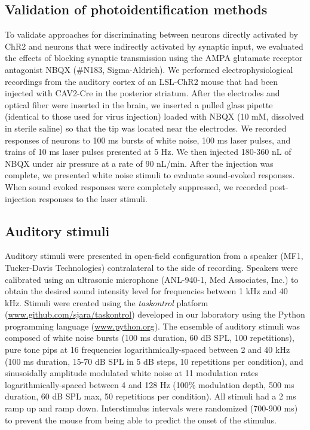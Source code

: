 \subsection{Validation of photoidentification methods}
To validate approaches for discriminating between neurons directly activated by ChR2 and neurons that were indirectly activated by synaptic input, we evaluated the effects of blocking synaptic transmission using the AMPA glutamate receptor antagonist NBQX (\#N183, Sigma-Aldrich). 
%
We performed electrophysiological recordings from the auditory cortex of an LSL-ChR2 mouse that had been injected with CAV2-Cre in the posterior striatum.
%
After the electrodes and optical fiber were inserted in the brain, we inserted a pulled glass pipette (identical to those used for virus injection) loaded with NBQX (10 mM, dissolved in sterile saline) so that the tip was located near the electrodes.
%
We recorded responses of neurons to 100 ms bursts of white noise, 100 ms laser pulses, and trains of 10 ms laser pulses presented at 5 Hz. 
%
We then injected 180-360 nL of NBQX under air pressure at a rate of 90 nL/min.
%
After the injection was complete, we presented white noise stimuli to evaluate sound-evoked responses.
%
When sound evoked responses were completely suppressed, we recorded post-injection responses to the laser stimuli.


\subsection{Auditory stimuli}
Auditory stimuli were presented in open-field configuration from a speaker (MF1, Tucker-Davis Technologies) contralateral to the side of recording. 
%
Speakers were calibrated using an ultrasonic microphone (ANL-940-1, Med Associates, Inc.) to obtain the desired sound intensity level for frequencies between 1 kHz and 40 kHz. 
%
Stimuli were created using the \textit{taskontrol} platform (\url{www.github.com/sjara/taskontrol}) developed in our laboratory using the Python programming language (\url{www.python.org}). 
%
The ensemble of auditory stimuli was composed of white noise bursts (100 ms duration, 60 dB SPL, 100 repetitions), pure tone pips at 16 frequencies logarithmically-spaced between 2 and 40 kHz (100 ms duration, 15-70 dB SPL in 5 dB steps, 10 repetitions per condition), and sinusoidally amplitude modulated white noise at 11 modulation rates logarithmically-spaced between 4 and 128 Hz (100\% modulation depth, 500 ms duration, 60 dB SPL max, 50 repetitions per condition).
%
All stimuli had a 2 ms ramp up and ramp down. 
%
Interstimulus intervals were randomized (700-900 ms) to prevent the mouse from being able to predict the onset of the stimulus. 

